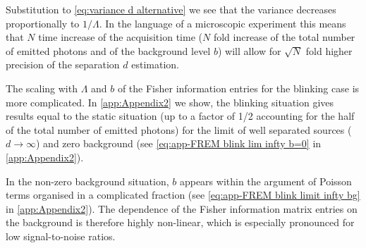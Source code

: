 Substitution to \autoref{eq:variance d alternative} we see that the variance decreases proportionally to $1/\Lambda$. In the language of a microscopic experiment this means that $N$ time increase of the acquisition time ($N$ fold increase of the total number of emitted photons and of the background level $b$) will allow for $\sqrt{N}$ fold higher precision of the separation $d$ estimation.

The scaling with $\Lambda$ and $b$ of the Fisher information entries for the blinking case is more complicated. In \autoref{app:Appendix2} we show, the blinking situation gives results equal to the static situation (up to a factor of 1/2 accounting for the half of the total number of emitted photons) for the limit of well separated sources ($d\rightarrow\infty$) and zero background (see \autoref{eq:app-FREM blink lim infty b=0} in \autoref{app:Appendix2}). 

In the non-zero background situation, $b$ appears within the argument of Poisson terms organised in a complicated fraction (see \autoref{eq:app-FREM blink limit infty bg} in \autoref{app:Appendix2}). The dependence of the Fisher information matrix entries on the background is therefore highly non-linear, which is especially pronounced for low signal-to-noise ratios.  


%
%




